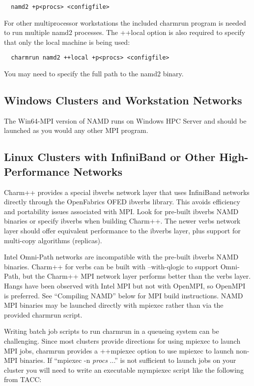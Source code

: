 \begin{verbatim}
  namd2 +p<procs> <configfile>
\end{verbatim}

For other multiprocessor workstations the included charmrun program is
needed to run multiple namd2 processes.  The ++local option is also
required to specify that only the local machine is being used:

\begin{verbatim}
  charmrun namd2 ++local +p<procs> <configfile>
\end{verbatim}

You may need to specify the full path to the namd2 binary.

\subsection{Windows Clusters and Workstation Networks}

The Win64-MPI version of NAMD runs on Windows HPC Server and should be
launched as you would any other MPI program.

\subsection{Linux Clusters with InfiniBand or Other High-Performance Networks}

Charm++ provides a special ibverbs network layer that uses InfiniBand
networks directly through the OpenFabrics OFED ibverbs library.  This
avoids efficiency and portability issues associated with MPI.  Look for
pre-built ibverbs NAMD binaries or specify ibverbs when building Charm++.
The newer verbs network layer should offer equivalent performance to
the ibverbs layer, plus support for multi-copy algorithms (replicas).
  
Intel Omni-Path networks are incompatible with the pre-built ibverbs
NAMD binaries.  Charm++ for verbs can be built with --with-qlogic 
to support Omni-Path, but the Charm++ MPI network layer performs
better than the verbs layer.  Hangs have been observed with Intel MPI
but not with OpenMPI, so OpenMPI is preferred.  See ``Compiling NAMD''
below for MPI build instructions.  NAMD MPI binaries may be launched
directly with mpiexec rather than via the provided charmrun script.

Writing batch job scripts to run charmrun in a queueing system can be
challenging.  Since most clusters provide directions for using mpiexec
to launch MPI jobs, charmrun provides a ++mpiexec option to use mpiexec
to launch non-MPI binaries.  If ``mpiexec -n {\em procs} ...'' is not
sufficient to launch jobs on your cluster you will need to write an
executable mympiexec script like the following from TACC:


